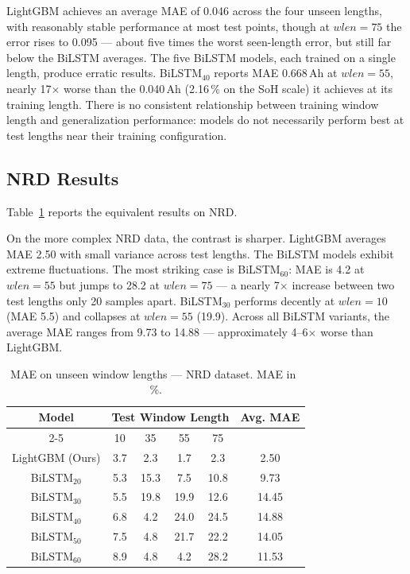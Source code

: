 LightGBM achieves an average MAE of 0.046 across the four unseen lengths, with reasonably stable performance at most test points, though at $wlen = 75$ the error rises to 0.095 --- about five times the worst seen-length error, but still far below the BiLSTM averages. The five BiLSTM models, each trained on a single length, produce erratic results. BiLSTM$_{40}$ reports MAE 0.668\,Ah at $wlen = 55$, nearly 17$\times$ worse than the 0.040\,Ah (2.16\,\% on the SoH scale) it achieves at its training length. There is no consistent relationship between training window length and generalization performance: models do not necessarily perform best at test lengths near their training configuration.

\subsection{NRD Results}

Table~\ref{tab:generalization_nrd} reports the equivalent results on NRD.

On the more complex NRD data, the contrast is sharper. LightGBM averages MAE 2.50 with small variance across test lengths. The BiLSTM models exhibit extreme fluctuations. The most striking case is BiLSTM$_{60}$: MAE is 4.2 at $wlen = 55$ but jumps to 28.2 at $wlen = 75$ --- a nearly 7$\times$ increase between two test lengths only 20 samples apart. BiLSTM$_{30}$ performs decently at $wlen = 10$ (MAE 5.5) and collapses at $wlen = 55$ (19.9). Across all BiLSTM variants, the average MAE ranges from 9.73 to 14.88 --- approximately 4--6$\times$ worse than LightGBM.

\begin{table}[H]
    \centering
    \setcellgapes{3pt}
    \makegapedcells
    \begin{tabular}{c c c c c c}
    \hline
    \multirow{2}{*}{Model} & \multicolumn{4}{c}{Test Window Length} & \multirow{2}{*}{Avg. MAE} \\
    \cline{2-5}
    & 10 & 35 & 55 & 75 & \\
    \hline
    LightGBM (Ours) & 3.7 & 2.3 & 1.7 & 2.3 & 2.50 \\
    BiLSTM$_{20}$ & 5.3 & 15.3 & 7.5 & 10.8 & 9.73 \\
    BiLSTM$_{30}$ & 5.5 & 19.8 & 19.9 & 12.6 & 14.45 \\
    BiLSTM$_{40}$ & 6.8 & 4.2 & 24.0 & 24.5 & 14.88 \\
    BiLSTM$_{50}$ & 7.5 & 4.8 & 21.7 & 22.2 & 14.05 \\
    BiLSTM$_{60}$ & 8.9 & 4.8 & 4.2 & 28.2 & 11.53 \\
    \hline
    \end{tabular}
    \caption{MAE on unseen window lengths  ---  NRD dataset. MAE in \,\%.}
    \label{tab:generalization_nrd}
\end{table}

